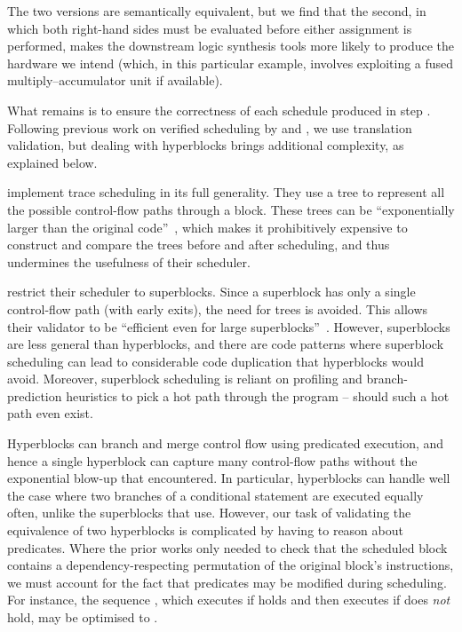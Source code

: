 \begin{enumerate}[label=\protect\blacknum{\arabic*}]
The two versions are semantically equivalent, but we find that the second, in
which both right-hand sides must be evaluated before either assignment is
performed, makes the downstream logic synthesis tools more likely to produce the
hardware we intend (which, in this particular example, involves exploiting a
fused multiply--accumulator unit if available).

\end{enumerate}

\noindent
What remains is to ensure the correctness of each schedule produced in step
. Following previous work on verified scheduling by
\textcite{tristan08_formal_verif_trans_valid} and
\textcite{six22_formal_verif_super_sched}, we use translation validation, but
dealing with hyperblocks brings additional complexity, as explained below.

\citeauthor{tristan08_formal_verif_trans_valid} implement trace scheduling in
its full generality. They use a tree to represent all the possible control-flow
paths through a block. These trees can be ``exponentially larger than the
original code''~\cite[p.~25]{tristan08_formal_verif_trans_valid}, which makes it
prohibitively expensive to construct and compare the trees before and after
scheduling, and thus undermines the usefulness of their scheduler.

\citeauthor{six22_formal_verif_super_sched} restrict their scheduler to
superblocks. Since a superblock has only a single control-flow path (with early
exits), the need for trees is avoided. This allows their validator to be
``efficient even for large
superblocks''~\cite[p.~53]{six22_formal_verif_super_sched}. However, superblocks
are less general than hyperblocks, and there are code patterns where superblock
scheduling can lead to considerable code duplication that hyperblocks would
avoid. Moreover, superblock scheduling is reliant on profiling and
branch-prediction heuristics to pick a hot path through the program -- should
such a hot path even exist.

Hyperblocks can branch and merge control flow using predicated execution, and
hence a single hyperblock can capture many control-flow paths without the
exponential blow-up that \citeauthor{tristan08_formal_verif_trans_valid}
encountered.  In particular, hyperblocks can handle well the case where two
branches of a conditional statement are executed equally often, unlike the
superblocks that \citeauthor{six22_formal_verif_super_sched} use. However, our
task of validating the equivalence of two hyperblocks is complicated by having
to reason about predicates. Where the prior works only needed to check that the
scheduled block contains a dependency-respecting permutation of the original
block's instructions, we must account for the fact that predicates may be
modified during scheduling. For instance, the sequence %
, which executes  if  holds
and then executes  if  does \emph{not} hold, may be
optimised to .

